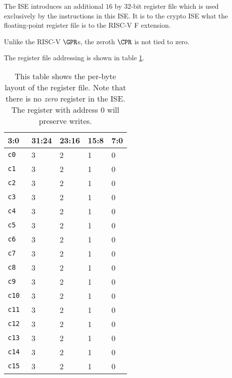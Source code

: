 
The ISE introduces an additional $16$ by $32$-bit register file which
is used exclusively by the instructions in this ISE.
It is to the crypto ISE what the floating-point register file is to the
RISC-V F extension.

Unlike the RISC-V $\GPR$s, the zeroth $\CPR$ is not tied to zero.

The register file addressing is shown in table \ref{tab:state-addr}.

\begin{table}[h!]
\centering
\begin{tabular}{|l|l l l l|}
\hline
\multicolumn{1}{|l|}{3:0} & \textbf{31:24} & \textbf{23:16} & \textbf{15:8} & \textbf{7:0} \\ \hline
{\tt c0  } & 3 & 2 & 1 & 0      \\ \hline
{\tt c1  } & 3 & 2 & 1 & 0      \\ \hline
{\tt c2  } & 3 & 2 & 1 & 0      \\ \hline
{\tt c3  } & 3 & 2 & 1 & 0      \\ \hline
{\tt c4  } & 3 & 2 & 1 & 0      \\ \hline
{\tt c5  } & 3 & 2 & 1 & 0      \\ \hline
{\tt c6  } & 3 & 2 & 1 & 0      \\ \hline
{\tt c7  } & 3 & 2 & 1 & 0      \\ \hline
{\tt c8  } & 3 & 2 & 1 & 0      \\ \hline
{\tt c9  } & 3 & 2 & 1 & 0      \\ \hline
{\tt c10 } & 3 & 2 & 1 & 0      \\ \hline
{\tt c11 } & 3 & 2 & 1 & 0      \\ \hline
{\tt c12 } & 3 & 2 & 1 & 0      \\ \hline
{\tt c13 } & 3 & 2 & 1 & 0      \\ \hline
{\tt c14 } & 3 & 2 & 1 & 0      \\ \hline
{\tt c15 } & 3 & 2 & 1 & 0      \\ \hline
\end{tabular}
\caption{This table shows the per-byte layout of the register file.
Note that there is no {\em zero} register in the ISE.
The register with address $0$ will preserve writes.}
\label{tab:state-addr}
\end{table}


